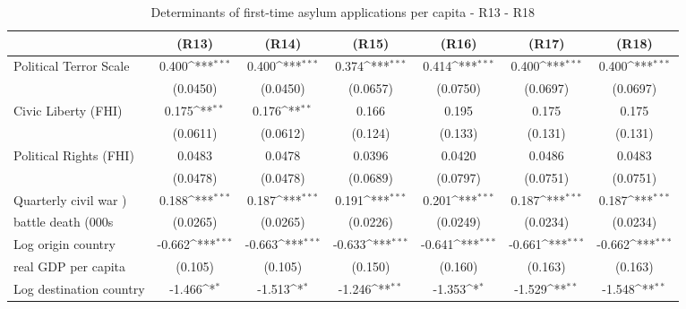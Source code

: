 \begin{table}[htbp]\centering  \footnotesize
\def\sym#1{\ifmmode^{#1}\else\(^{#1}\)\fi}
\caption{Determinants of first-time asylum applications per capita - R13 - R18}
\begin{tabular}{l*{6}{c}}
\hline\hline
                    &\multicolumn{1}{c}{(R13)}         &\multicolumn{1}{c}{(R14)}         &\multicolumn{1}{c}{(R15)}         &\multicolumn{1}{c}{(R16)}         &\multicolumn{1}{c}{(R17)}         &\multicolumn{1}{c}{(R18)}         \\
\hline
Political Terror Scale&       0.400\sym{***}&       0.400\sym{***}&       0.374\sym{***}&       0.414\sym{***}&       0.400\sym{***}&       0.400\sym{***}\\
                    &    (0.0450)         &    (0.0450)         &    (0.0657)         &    (0.0750)         &    (0.0697)         &    (0.0697)         \\
[0,5em]
Civic Liberty (FHI) &       0.175\sym{**} &       0.176\sym{**} &       0.166         &       0.195         &       0.175         &       0.175         \\
                    &    (0.0611)         &    (0.0612)         &     (0.124)         &     (0.133)         &     (0.131)         &     (0.131)         \\
[0,5em]
Political Rights (FHI)&      0.0483         &      0.0478         &      0.0396         &      0.0420         &      0.0486         &      0.0483         \\
                    &    (0.0478)         &    (0.0478)         &    (0.0689)         &    (0.0797)         &    (0.0751)         &    (0.0751)         \\
[0,5em]
Quarterly civil war )&       0.188\sym{***}&       0.187\sym{***}&       0.191\sym{***}&       0.201\sym{***}&       0.187\sym{***}&       0.187\sym{***}\\
battle death (000s                    &    (0.0265)         &    (0.0265)         &    (0.0226)         &    (0.0249)         &    (0.0234)         &    (0.0234)         \\
[0,5em]
Log origin country &      -0.662\sym{***}&      -0.663\sym{***}&      -0.633\sym{***}&      -0.641\sym{***}&      -0.661\sym{***}&      -0.662\sym{***}\\
real GDP per capita                    &     (0.105)         &     (0.105)         &     (0.150)         &     (0.160)         &     (0.163)         &     (0.163)         \\
[0,5em]
Log destination country&      -1.466\sym{*}  &      -1.513\sym{*}  &      -1.246\sym{**} &      -1.353\sym{*}  &      -1.529\sym{**} &      -1.548\sym{**} \\

\end{tabular}
\end{table}

